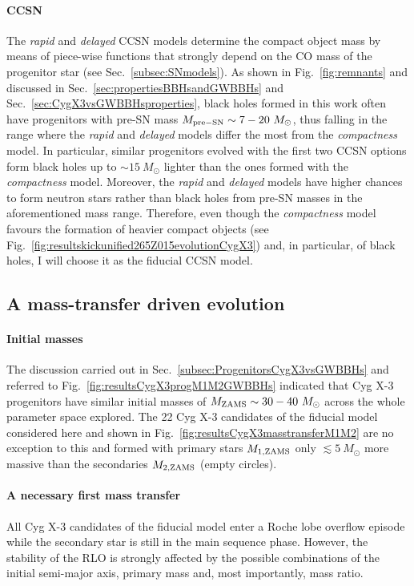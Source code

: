 \documentclass[a4paper,titlepage]{book}     	%
\newcommand{\sun}{\ensuremath{_\odot}}
\newcommand{\msun}{\ensuremath{M\sun}}
\begin{document}
\paragraph{CCSN} The \emph{rapid} and \emph{delayed} CCSN models determine the compact object mass by means of piece-wise functions that strongly depend on the CO mass of the progenitor star (see Sec.\ \ref{subsec:SNmodels}). As shown in Fig.\ \ref{fig:remnants} and discussed in Sec.\ \ref{sec:propertiesBBHsandGWBBHs} and Sec.\ \ref{sec:CygX3vsGWBBHsproperties}, black holes formed in this work often have progenitors with pre-SN mass $M_{\rm pre-SN} \sim 7-20~\msun$, thus falling in the range where the \emph{rapid} and \emph{delayed} models differ the most from the \emph{compactness} model. In particular, similar progenitors evolved with the first two CCSN options form black holes up to $\sim 15~\msun$ lighter than the ones formed with the \emph{compactness} model. Moreover, the \emph{rapid} and \emph{delayed} models have higher chances to form neutron stars rather than black holes from pre-SN masses in the aforementioned mass range. Therefore, even though the \emph{compactness} model favours the formation of heavier compact objects (see Fig.\ \ref{fig:resultskickunified265Z015evolutionCygX3}) and, in particular, of black holes, I will choose it as the fiducial CCSN model.





\subsection{A mass-transfer driven evolution}\label{subsec:CygX3masstransferdrivenevo}
\paragraph{Initial masses} The discussion carried out in Sec.\ \ref{subsec:ProgenitorsCygX3vsGWBBHs} and referred to Fig.\ \ref{fig:resultsCygX3progM1M2GWBBHs} indicated that Cyg X-3 progenitors have similar initial masses of $M_{\rm ZAMS} \sim 30-40~\msun$ across the whole parameter space explored. The 22 Cyg X-3 candidates of the fiducial model considered here and shown in Fig.\ \ref{fig:resultsCygX3masstransferM1M2} are no exception to this and formed with primary stars $M_{\rm 1, ZAMS}$ only $\lesssim 5~\msun$ more massive than the secondaries $M_{\rm 2, ZAMS}$ (empty circles).

\paragraph{A necessary first mass transfer} All Cyg X-3 candidates of the fiducial model enter a Roche lobe overflow episode while the secondary star is still in the main sequence phase. However, the stability of the RLO is strongly affected by the possible combinations of the initial semi-major axis, primary mass and, most importantly, mass ratio.\\
\end{document}
